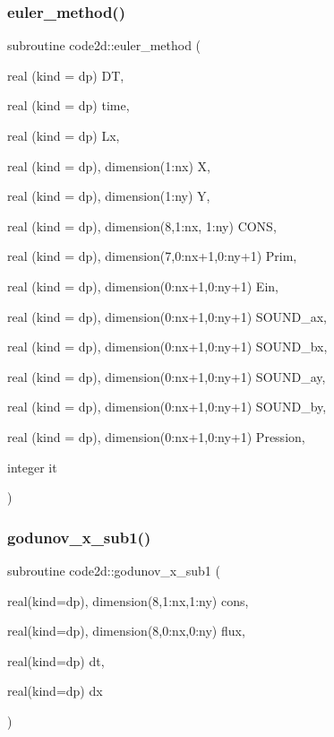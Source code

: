 \mbox{\label{main2Dv1_01_07copy_08_8f90_a1874243fd0ebdb9c1e1cd78468b4cfac}} 
\subsubsection{\texorpdfstring{euler\+\_\+method()}{euler\_method()}}
{\footnotesize\ttfamily subroutine code2d\+::euler\+\_\+method (\begin{DoxyParamCaption}\item[{real (kind = dp)}]{DT,  }\item[{real (kind = dp)}]{time,  }\item[{real (kind = dp)}]{Lx,  }\item[{real (kind = dp), dimension(1\+:nx)}]{X,  }\item[{real (kind = dp), dimension(1\+:ny)}]{Y,  }\item[{real (kind = dp), dimension(8,1\+:nx, 1\+:ny)}]{C\+O\+NS,  }\item[{real (kind = dp), dimension(7,0\+:nx+1,0\+:ny+1)}]{Prim,  }\item[{real (kind = dp), dimension(0\+:nx+1,0\+:ny+1)}]{Ein,  }\item[{real (kind = dp), dimension(0\+:nx+1,0\+:ny+1)}]{S\+O\+U\+N\+D\+\_\+ax,  }\item[{real (kind = dp), dimension(0\+:nx+1,0\+:ny+1)}]{S\+O\+U\+N\+D\+\_\+bx,  }\item[{real (kind = dp), dimension(0\+:nx+1,0\+:ny+1)}]{S\+O\+U\+N\+D\+\_\+ay,  }\item[{real (kind = dp), dimension(0\+:nx+1,0\+:ny+1)}]{S\+O\+U\+N\+D\+\_\+by,  }\item[{real (kind = dp), dimension(0\+:nx+1,0\+:ny+1)}]{Pression,  }\item[{integer}]{it }\end{DoxyParamCaption})}

\mbox{\label{main2Dv1_01_07copy_08_8f90_aec66a1d113ade1d60ad864482ea8e4cf}} 
\subsubsection{\texorpdfstring{godunov\+\_\+x\+\_\+sub1()}{godunov\_x\_sub1()}}
{\footnotesize\ttfamily subroutine code2d\+::godunov\+\_\+x\+\_\+sub1 (\begin{DoxyParamCaption}\item[{real(kind=dp), dimension(8,1\+:nx,1\+:ny)}]{cons,  }\item[{real(kind=dp), dimension(8,0\+:nx,0\+:ny)}]{flux,  }\item[{real(kind=dp)}]{dt,  }\item[{real(kind=dp)}]{dx }\end{DoxyParamCaption})}

